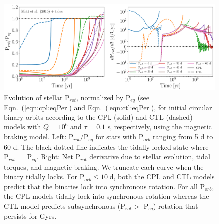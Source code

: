 \documentclass[twocolumn]{aastex61}
\begin{document}
\begin{figure}
	\includegraphics[width=\textwidth]{../Plots/eqPerTwoPanelMatt.pdf}
   \caption{Evolution of stellar P$_{rot}$, normalized by P$_{eq}$ (see Eqn.~(\ref{eqn:cpl:eqPer}) and Eqn.~(\ref{eqn:ctl:eqPer}), for initial circular binary orbits according to the CPL (solid) and CTL (dashed) models with $Q = 10^6$ and $\tau = 0.1$ s, respectively, using the \citet{Matt2015} magnetic braking model. Left: P$_{rot}/$P$_{eq}$ for stars with P$_{orb}$ ranging from 5 d to 60 d. The black dotted line indicates the tidally-locked state where P$_{rot} = $ P$_{eq}$.  Right: Net P$_{rot}$ derivative due to stellar evolution, tidal torques, and magnetic braking.  We truncate each curve when the binary tidally locks. For P$_{orb} \leq 10$ d, both the CPL and CTL models predict that the binaries lock into synchronous rotation.  For all P$_{orb}$, the CPL models tidally-lock into synchronous rotation whereas the CTL model predicts subsynchronous (P$_{rot} > $ P$_{eq}$) rotation that persists for Gyrs.}%
    \label{fig:eqPer}%
\end{figure}

\end{document}
